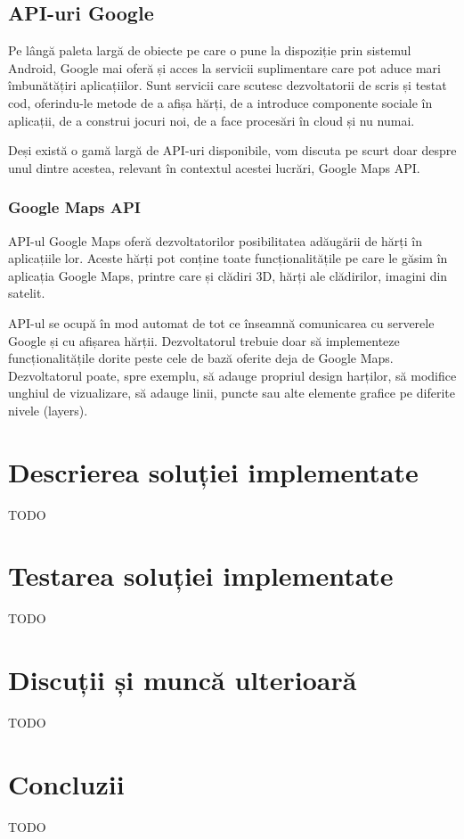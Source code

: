 \documentclass[12pt,a4paper]{article}
\begin{document}
\subsection{API-uri Google}
Pe lângă paleta largă de obiecte pe care o pune la dispoziție prin sistemul Android, Google mai oferă și acces la servicii suplimentare care pot aduce mari îmbunătățiri aplicațiilor. Sunt servicii care scutesc dezvoltatorii de scris și testat cod, oferindu-le metode de a afișa hărți, de a introduce componente sociale în aplicații, de a construi jocuri noi, de a face procesări în cloud și nu numai.

Deși există o gamă largă de API-uri disponibile, vom discuta pe scurt doar despre unul dintre acestea, relevant în contextul acestei lucrări, Google Maps API.

\subsubsection{Google Maps API \cite{GoogleMapsAndroidAPI}}
API-ul Google Maps oferă dezvoltatorilor posibilitatea adăugării de hărți în aplicațiile lor. Aceste hărți pot conține toate funcționalitățile pe care le găsim în aplicația Google Maps, printre care și clădiri 3D, hărți ale clădirilor, imagini din satelit.

API-ul se ocupă în mod automat de tot ce înseamnă comunicarea cu serverele Google și cu afișarea hărții. Dezvoltatorul trebuie doar să implementeze funcționalitățile dorite peste cele de bază oferite deja de Google Maps. Dezvoltatorul poate, spre exemplu, să adauge propriul design harților, să modifice unghiul de vizualizare, să adauge linii, puncte sau alte elemente grafice pe diferite nivele (layers).

\newpage




\newpage
\section{Descrierea soluției implementate} \label{DescriereAplicatie}
TODO



\newpage
\section{Testarea soluției implementate} \label{TestareAplicatie}
TODO


\newpage
\section{Discuții și muncă ulterioară} \label{Discutii}
TODO



\newpage
\section{Concluzii} \label{Concluzii}
TODO



\newpage
{}


\nocite{*}
\end{document}
